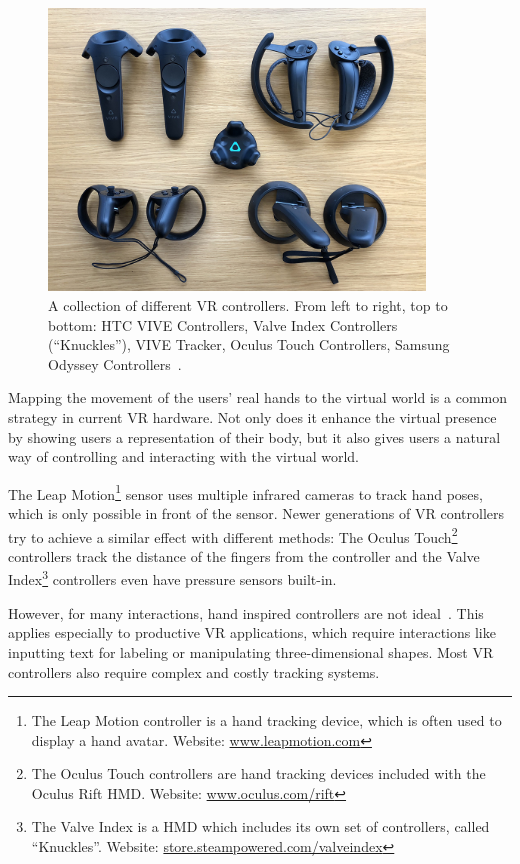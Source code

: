 \begin{figure}[H]%
	\centering%
	\includegraphics[width=10cm]{figures/introduction/vr_controllers.jpg}%
	\caption[Collection of VR controllers]{A collection of different \gls{VR} controllers. From left to right, top to bottom: HTC VIVE Controllers, Valve Index Controllers (\enquote{Knuckles}), VIVE Tracker, Oculus Touch Controllers, Samsung Odyssey Controllers~\cite{Yang.2018}.}\label{fig:vr-controllers}
\end{figure}

Mapping the movement of the users' real hands to the virtual world is a common strategy in current \gls{VR} hardware. Not only does it enhance the virtual presence by showing users a representation of their body, but it also gives users a natural way of controlling and interacting with the virtual world.

The Leap Motion\footnote{The Leap Motion controller is a hand tracking device, which is often used to display a hand avatar. Website: \href{https://www.leapmotion.com/}{www.leapmotion.com}} sensor uses multiple infrared cameras to track hand poses, which is only possible in front of the sensor. Newer generations of \gls{VR} controllers try to achieve a similar effect with different methods: The Oculus Touch\footnote{The Oculus Touch controllers are hand tracking devices included with the Oculus Rift \gls{HMD}. Website: \href{https://www.oculus.com/rift/}{www.oculus.com/rift}} controllers track the distance of the fingers from the controller and the Valve Index\footnote{The Valve Index is a \gls{HMD} which includes its own set of controllers, called \enquote{Knuckles}. Website: \href{https://store.steampowered.com/valveindex}{store.steampowered.com/valveindex}} controllers even have pressure sensors built-in.

However, for many interactions, hand inspired controllers are not ideal~\cite{Bowman.2012}. This applies especially to productive \gls{VR} applications, which require interactions like inputting text for labeling or manipulating three-dimensional shapes. Most \gls{VR} controllers also require complex and costly tracking systems.

